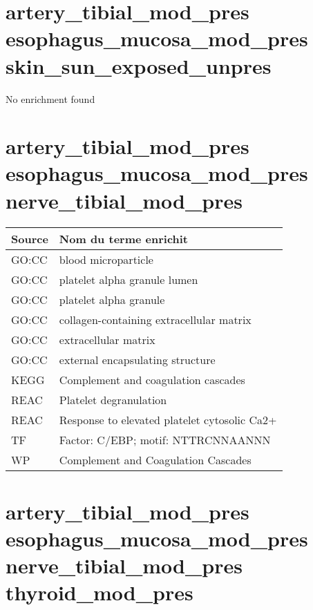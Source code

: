 \section*{artery\_tibial\_mod\_pres \newline esophagus\_mucosa\_mod\_pres \newline skin\_sun\_exposed\_unpres}
No enrichment found

\section*{artery\_tibial\_mod\_pres \newline esophagus\_mucosa\_mod\_pres \newline nerve\_tibial\_mod\_pres}

\begin{longtable}{ll}
\toprule
Source & Nom du terme enrichit\\
\midrule
GO:CC & blood microparticle\\
GO:CC & platelet alpha granule lumen\\
GO:CC & platelet alpha granule\\
GO:CC & collagen-containing extracellular matrix\\
GO:CC & extracellular matrix\\
GO:CC & external encapsulating structure\\
KEGG & Complement and coagulation cascades\\
REAC & Platelet degranulation\\
REAC & Response to elevated platelet cytosolic Ca2+\\
TF & Factor: C/EBP; motif: NTTRCNNAANNN\\
WP & Complement and Coagulation Cascades\\
\bottomrule
\end{longtable}

\section*{artery\_tibial\_mod\_pres \newline esophagus\_mucosa\_mod\_pres \newline nerve\_tibial\_mod\_pres \newline thyroid\_mod\_pres}

